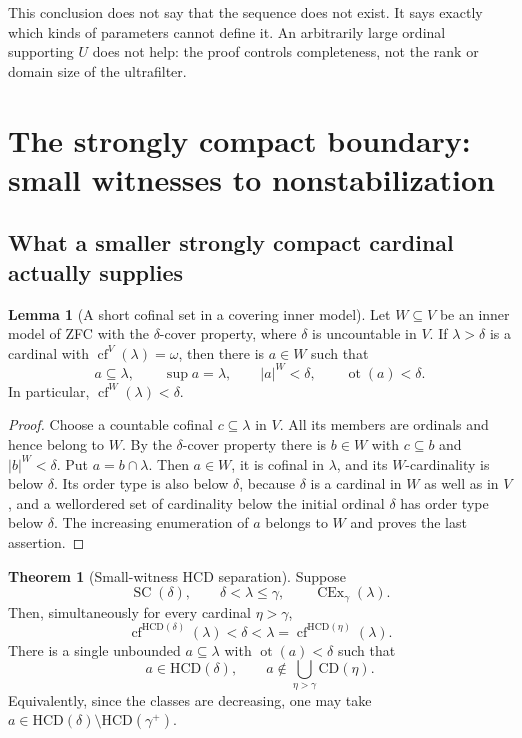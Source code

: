 \documentclass[11pt,letterpaper]{article}
\theoremstyle{definition}
\newtheorem{theorem}[definition]{Theorem}
\newtheorem{lemma}[definition]{Lemma}
\newcommand{\SC}{\operatorname{SC}}
\newcommand{\CEx}{\operatorname{CEx}}
\newcommand{\cf}{\operatorname{cf}}
\newcommand{\ot}{\operatorname{ot}}
\newcommand{\HCD}{\mathrm{HCD}}
\newcommand{\CD}{\mathrm{CD}}
\newcommand{\Cex}[2]{\CEx_{#1}(#2)}
\theoremstyle{remark}
\begin{document}
This conclusion does not say that the sequence does not exist. It says exactly which kinds of parameters cannot define it. An arbitrarily large ordinal supporting $U$ does not help: the proof controls completeness, not the rank or domain size of the ultrafilter.

\section{The strongly compact boundary: small witnesses to nonstabilization}\label{sec:separation}

\subsection{What a smaller strongly compact cardinal actually supplies}

\begin{lemma}[A short cofinal set in a covering inner model]\label{lem:cover-cofinal}
Let $W\subseteq V$ be an inner model of ZFC with the $\delta$-cover property, where $\delta$ is uncountable in $V$. If $\lambda>\delta$ is a cardinal with $\cf^V(\lambda)=\omega$, then there is $a\in W$ such that
\[
 a\subseteq\lambda,\qquad \sup a=\lambda,
 \qquad |a|^W<\delta,\qquad \ot(a)<\delta.
\]
In particular, $\cf^W(\lambda)<\delta$.
\end{lemma}

\begin{proof}
Choose a countable cofinal $c\subseteq\lambda$ in $V$. All its members are ordinals and hence belong to $W$. By the $\delta$-cover property there is $b\in W$ with $c\subseteq b$ and $|b|^W<\delta$. Put $a=b\cap\lambda$. Then $a\in W$, it is cofinal in $\lambda$, and its $W$-cardinality is below $\delta$. Its order type is also below $\delta$, because $\delta$ is a cardinal in $W$ as well as in $V$, and a wellordered set of cardinality below the initial ordinal $\delta$ has order type below $\delta$. The increasing enumeration of $a$ belongs to $W$ and proves the last assertion.
\end{proof}

\begin{theorem}[Small-witness HCD separation]\label{thm:gap}
Suppose
\[
 \SC(\delta),\qquad \delta<\lambda\leq\gamma,
 \qquad \Cex{\gamma}{\lambda}.
\]
Then, simultaneously for every cardinal $\eta>\gamma$,
\begin{equation}
 \cf^{\HCD(\delta)}(\lambda)<\delta
 <\lambda=\cf^{\HCD(\eta)}(\lambda).\label{eq:gap}
\end{equation}
There is a single unbounded $a\subseteq\lambda$ with $\ot(a)<\delta$ such that
\begin{equation}
 a\in\HCD(\delta),\qquad
 a\notin\bigcup_{\eta>\gamma}\CD(\eta).\label{eq:small-witness}
\end{equation}
Equivalently, since the classes are decreasing, one may take
$a\in\HCD(\delta)\setminus\HCD(\gamma^+)$.
\end{theorem}
\end{document}
